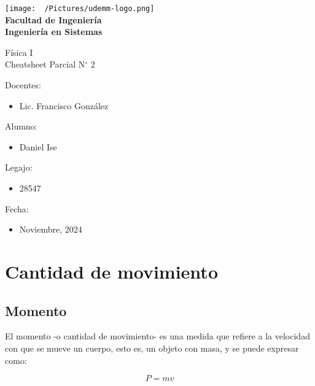\documentclass[12pt]{article}
\begin{document}
\thispagestyle{empty}

\begin{center}
	\vspace*{.5cm}
	\texttt{[image: ~/Pictures/udemm-logo.png]}\\
	\vspace{.2cm}
	\Large
	\textbf{Facultad de Ingeniería}\\
	\textbf{Ingeniería en Sistemas}\\
	\vspace{2cm}

	\Huge
	Física I\\
	Cheatsheet Parcial N\(^\circ\) 2\\
	\vfill

	\raggedright
	\Large
	Docentes:
	\begin{itemize}
		\item[] Lic. Francisco González \\
	\end{itemize}
	Alumno:
	\begin{itemize}
		\item[] Daniel Ise
	\end{itemize}
	Legajo:
	\begin{itemize}
		\item[] 28547
	\end{itemize}
	Fecha:
	\begin{itemize}
		\item[] Noviembre, 2024
	\end{itemize}
\end{center}

\pagebreak

\tableofcontents



\pagebreak

\section{Cantidad de movimiento}

\subsection{Momento}

El momento -o cantidad de movimiento-
es una medida que refiere a la velocidad con que se mueve un cuerpo,
esto es,
un objeto con masa,
y se puede expresar como:

\begin{equation}
	P = mv
\end{equation}
\end{document}
